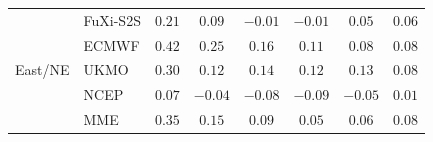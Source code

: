 \begin{table}[t]
\begin{tabular}{llcccccc}
\midrule
\multirow{5}{*}{East/NE} & FuXi-S2S       & $0.21$ & $0.09$ & $-0.01$ & $-0.01$ & $0.05$ & $0.06$ \\
 & ECMWF          & $\mathbf{0.42}$ & $\mathbf{0.25}$ & $\mathbf{0.16}$ & $0.11$ & $0.08$ & $\mathbf{0.08}$ \\
 & UKMO           & $0.30$ & $0.12$ & $0.14$ & $\mathbf{0.12}$ & $\mathbf{0.13}$ & $0.08$ \\
 & NCEP           & $0.07$ & $-0.04$ & $-0.08$ & $-0.09$ & $-0.05$ & $0.01$ \\
 & MME            & $0.35$ & $0.15$ & $0.09$ & $0.05$ & $0.06$ & $0.08$ \\
    \bottomrule
    \end{tabular}\end{table}
